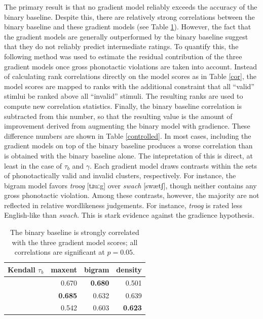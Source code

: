 The primary result is that no gradient model reliably exceeds the accuracy of the binary baseline. Despite this, there are relatively strong correlations between the binary baseline and these gradient models (see Table \ref{bcor}). However, the fact that the gradient models are generally outperformed by the binary baseline suggest that they do not reliably predict intermediate ratings. To quantify this, the following method was used to estimate the residual contribution of the three gradient models once gross phonotactic violations are taken into account. Instead of calculating rank correlations directly on the model scores as in Table \ref{cor}, the model scores are mapped to ranks with the additional constraint that all ``valid'' stimlui be ranked above all ``invalid'' stimuli. The resulting ranks are used to compute new correlation statistics. Finally, the binary baseline correlation is subtracted from this number, so that the resulting value is the amount of improvement derived from augmenting the binary model with gradience. These difference numbers are shown in Table \ref{controlled}. In most cases, including the gradient models on top of the binary baseline produces a worse correlation than is obtained with the binary baseline alone. The intepretation of this is direct, at least in the case of $\tau_b$ and $\gamma$. Each gradient model draws contrasts within the sets of phonotactically valid and invalid clusters, respectively. For instance, the bigram model favors \emph{troog} [tɹuːg] over \emph{swach} [swætʃ], though neither contains any gross phonotactic violation. Among these contrasts, however, the majority are not reflected in relative wordlikeness judgements. For instance, \emph{troog} is rated less English-like than \emph{swach}. This is stark evidence against the gradience hypothesis.

\begin{table} \label{bcor}
\centering
\begin{tabular}{l r r r}
\toprule
Kendall $\tau_b$          & maxent         & bigram         & density  \\
\midrule
\citealt{Greenberg1964}   & 0.670          & \textbf{0.680} & 0.501 \\
\citealt{Scholes1966}     & \textbf{0.685} & 0.632          & 0.639 \\
\citealt{Albright2003b}   & 0.542          & 0.603          & \textbf{0.623} \\
\bottomrule
\end{tabular}
\caption{The binary baseline is strongly correlated with the three gradient model scores; all correlations are significant at $p = 0.05$.}
\end{table}

